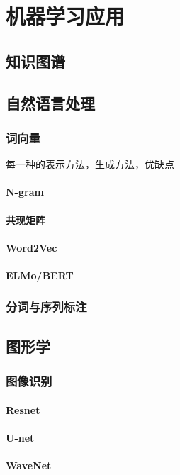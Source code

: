 \chapter{机器学习应用}
    \section{知识图谱}
    \section{自然语言处理}
    \subsection{词向量}
    每一种的表示方法，生成方法，优缺点
    \subsubsection{N-gram}
    \subsubsection{共现矩阵}
    \subsubsection{Word2Vec}
    \subsubsection{ELMo/BERT}
    \subsection{分词与序列标注}
    \section{图形学}
    \subsection{图像识别}
    \subsubsection{Resnet}
    \subsubsection{U-net}
    \subsubsection{WaveNet}

